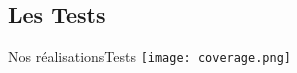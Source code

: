 \subsection{Les Tests}

\begin{frame}{Nos réalisations}{Tests}
	\texttt{[image: coverage.png]}
\end{frame}